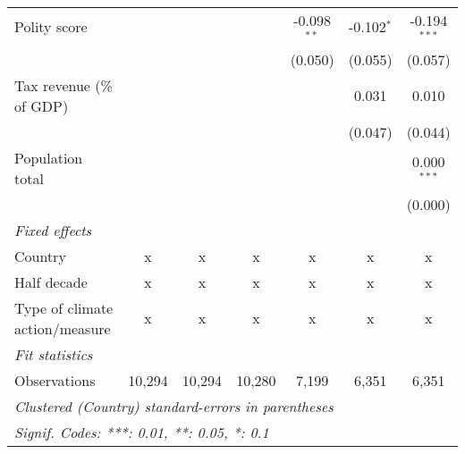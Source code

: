 \begin{tabular}{lcccccc}
   Polity score                                                                &             &         &         & -0.098$^{**}$ & -0.102$^{*}$ & -0.194$^{***}$\\   
                                                                               &             &         &         & (0.050)       & (0.055)      & (0.057)\\   
   Tax revenue (\% of GDP)                                                     &             &         &         &               & 0.031        & 0.010\\   
                                                                               &             &         &         &               & (0.047)      & (0.044)\\   
   Population total                                                            &             &         &         &               &              & 0.000$^{***}$\\   
                                                                               &             &         &         &               &              & (0.000)\\   
   \emph{Fixed effects}\\
   Country                                                                     & x           & x       & x       & x             & x            & x\\  
   Half decade                                                                 & x           & x       & x       & x             & x            & x\\  
   Type of climate action/measure                                              & x           & x       & x       & x             & x            & x\\  
   \midrule \emph{Fit statistics}\\
   Observations                                                                & 10,294      & 10,294  & 10,280  & 7,199         & 6,351        & 6,351\\  
   \midrule
   \multicolumn{7}{l}{\emph{Clustered (Country) standard-errors in parentheses}}\\
   \multicolumn{7}{l}{\emph{Signif. Codes: ***: 0.01, **: 0.05, *: 0.1}}\\
\end{tabular}
\par\endgroup


